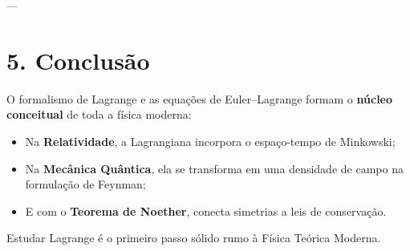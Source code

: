 \documentclass[a4paper,12pt]{article}
\begin{document}
---

\section*{5. Conclusão}
O formalismo de Lagrange e as equações de Euler–Lagrange formam o \textbf{núcleo conceitual} de toda a física moderna:
\begin{itemize}
    \item Na \textbf{Relatividade}, a Lagrangiana incorpora o espaço-tempo de Minkowski;
    \item Na \textbf{Mecânica Quântica}, ela se transforma em uma densidade de campo na formulação de Feynman;
    \item E com o \textbf{Teorema de Noether}, conecta simetrias a leis de conservação.
\end{itemize}

Estudar Lagrange é o primeiro passo sólido rumo à Física Teórica Moderna.
\end{document}
